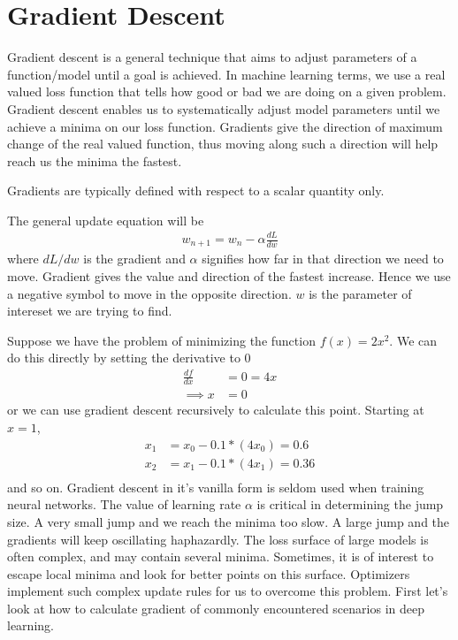 \documentclass[../../deep_learning_notes.tex]{subfiles}
\begin{document}
\chapter{Gradient Descent}
Gradient descent is a general technique that aims to adjust parameters of a function/model until a goal is achieved. In machine learning terms, we use a real valued loss function that tells how good or bad we are doing on a given problem. Gradient descent enables us to systematically adjust model parameters until we achieve a minima on our loss function. Gradients give the direction of maximum change of the real valued function, thus moving along such a direction will help reach us the minima the fastest.\newline

Gradients are typically defined with respect to a scalar quantity only.\newline

The general update equation will be
\begin{align*}
    w_{n+1} = w_{n} - \alpha \frac{dL}{dw}
\end{align*}
where $dL/dw$ is the gradient and $\alpha$ signifies how far in that direction we need to move. Gradient gives the value and direction of the fastest increase. Hence we use a negative symbol to move in the opposite direction. $w$ is the parameter of intereset we are trying to find.\newline

Suppose we have the problem of minimizing the function $f(x) = 2x^{2}$. We can do this directly by setting the derivative to 0
\begin{align*}
    \frac{df}{dx} &= 0 = 4x\\
    \implies x&= 0
\end{align*}
or we can use gradient descent recursively to calculate this point. Starting at $x=1$,
\begin{align*}
     x_{1} &= x_{0} - 0.1 * (4x_{0}) = 0.6\\
     x_{2} &= x_{1} - 0.1 * (4x_{1}) = 0.36\\
\end{align*}
and so on. Gradient descent in it's vanilla form is seldom used when training neural networks. The value of learning rate $\alpha$ is critical in determining the jump size. A very small jump and we reach the minima too slow. A large jump and the gradients will keep oscillating haphazardly. The loss surface of large models is often complex, and may contain several minima. Sometimes, it is of interest to escape local minima and look for better points on this surface. Optimizers implement such complex update rules for us to overcome this problem. First let's look at how to calculate gradient of commonly encountered scenarios in deep learning.
\end{document}
